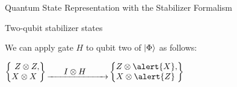 \begin{frame}{Quantum State Representation with the
					\alert{Stabilizer Formalism}}
\begin{exampleblock}{Two-qubit stabilizer states}
\pause

\vspace{.5em}

We can apply gate $H $ to qubit two of $\ket{\Phi}$ as follows:
\vspace{.5em}

\centering
$\left\{\amat{Z\otimes Z,\\ X\otimes X\phantom,}\right\} \underrightarrow{~~~~~~I \otimes H~~~~~~~~}
\left\{\amat{Z\otimes \alert{X},\\ X\otimes \alert{Z}\phantom,}\right\} 
$

%
%

\end{exampleblock}

\vspace{-.5em}
\pause


\end{frame}
